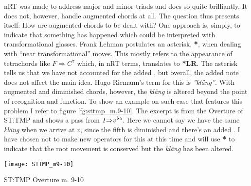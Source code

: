 \ac{nRT} was made to address major and minor triads and does so quite brilliantly. It does not, however, handle augmented chords at all. The question thus presents itself: How are augmented chords to be dealt with? One approach is, simply, to indicate that something has happened which could be interpreted with transformational glasses. Frank Lehman postulates an asterisk, \textbf{*}\parencite{lehman_reading_2012}, when dealing with ``near transformational'' moves. This mostly refers to the appearance of tetrachords like \(F{\Rightarrow}C{^7}\) which, in \ac{nRT} terms, translates to \textbf{*LR}. The asterisk tells us that we have not accounted for the added \textit{}, but overall, the added note does not affect the main idea. Hugo Riemann's term for this is \textit{''kläng''}. With augmented and diminished chords, however, the \textit{kläng} is altered beyond the point of recognition and function. To show an example on such case that features this problem I refer to figure \ref{fg:sttmp_m.9-10}. The excerpt is from the Overture of \ac{ST:TMP} and shows a pass from \({I}{\Rightarrow}{v}^{\hspace*{0.18ex}\flat\hspace*{0.18ex}5}\). Here we cannot say we have the same \textit{kläng} when we arrive at \(v\), since the fifth is diminished and there's an added . I have chosen not to make new operators for this at this time and will use \textbf{*} to indicate that the root movement is conserved but the \textit{kläng} has been altered.

\begin{marginfigure}[-4cm]
\texttt{[image: STTMP\_m9-10]}
\caption{ST:TMP Overture m. 9-10}
\label{fg:sttmp_m.9-10}
\end{marginfigure}
